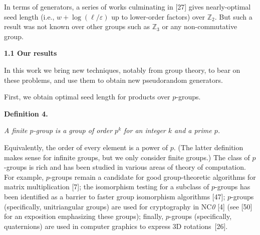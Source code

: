In terms of generators, a series of works culminating in [27]
gives nearly-optimal seed length (i.e., $w+\log(\ell/\varepsilon)$ up to lower-order
factors) over $\mathbb{Z}_{2}$. But such a result was not known over other groups such as $\mathbb{Z}_{3}$ or any non-commutative group.\par





\par\medskip\noindent\textbf{
1.1 Our results}\par




In this work we bring new techniques, notably from group theory, to
bear on these problems, and use them to obtain new pseudorandom generators.\par




First, we obtain optimal seed length for products over $p$-groups.\par





\par\medskip\noindent\textbf{
\textbf{Definition 4}\textbf{.}
}\par



\emph{A finite $p$-group is a group of order $p^{k}$ for an integer $k$
and a prime $p$.}\par






Equivalently, the order of every element is a power of $p$. (The
latter definition makes sense for infinite groups, but we only consider
finite groups.) The class of $p$-groups is rich and has been studied in
various areas of theory of computation. For example, $p$-groups remain
a candidate for good group-theoretic algorithms for matrix multiplication
[7]; the isomorphism testing
for a subclass of $p$-groups has been identified as a barrier to
faster group isomorphism algorithms [47];
$p$-groups (specifically, unitriangular groups) are used for cryptography
in NC\emph{0} [4] (see [50] for
an exposition emphasizing these groups); finally, $p$-groups (specifically,
quaternions) are used in computer graphics to express 3D rotations [26].\par




